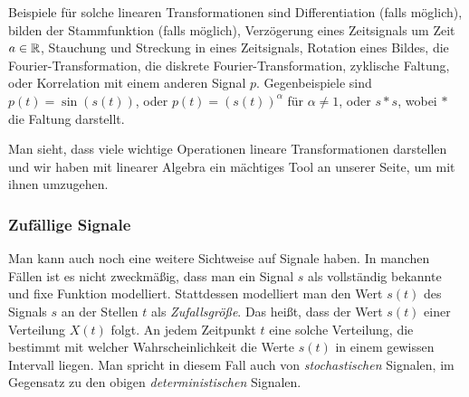 Beispiele für solche linearen Transformationen sind Differentiation (falls möglich), bilden der Stammfunktion (falls möglich), Verzögerung eines Zeitsignals um Zeit $a \in \mathbb{R}$, Stauchung und Streckung in eines Zeitsignals, Rotation eines Bildes, die Fourier-Transformation, die diskrete Fourier-Transformation, zyklische Faltung, oder Korrelation mit einem anderen Signal $p$.
Gegenbeispiele sind $p(t) = \sin(s(t))$, oder $p(t) = (s(t))^\alpha$ für $\alpha \neq 1$, oder $s \ast s$, wobei $\ast$ die Faltung darstellt.

Man sieht, dass viele wichtige Operationen lineare Transformationen darstellen und wir haben mit linearer Algebra ein mächtiges Tool an unserer Seite, um mit ihnen umzugehen.
%
%
\subsubsection{Zufällige Signale}
%
Man kann auch noch eine weitere Sichtweise auf Signale haben. 
In manchen Fällen ist es nicht zweckmäßig, dass man ein Signal $s$ als vollständig bekannte und fixe Funktion modelliert.
Stattdessen modelliert man den Wert $s(t)$ des Signals $s$ an der Stellen $t$ als \emph{Zufallsgröße}.
Das heißt, dass der Wert $s(t)$ einer Verteilung $X(t)$ folgt. 
An jedem Zeitpunkt $t$  eine solche Verteilung, die bestimmt mit welcher Wahrscheinlichkeit die Werte $s(t)$ in einem gewissen Intervall liegen.
Man spricht in diesem Fall auch von \emph{stochastischen} Signalen, im Gegensatz zu den obigen \emph{deterministischen} Signalen.

